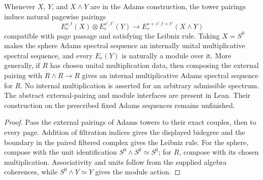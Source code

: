 \begin{theorem}
  \label{thm:adams-external-pairing}
  \notready
  Whenever $X$, $Y$, and $X\wedge Y$ are in the Adams construction, the tower
  pairings induce natural pagewise pairings
  \[
    E_r^{s,t}(X)\otimes E_r^{s',t'}(Y)
      \longrightarrow E_r^{s+s',t+t'}(X\wedge Y)
  \]
  compatible with page passage and satisfying the Leibniz rule.  Taking
  $X=S^0$ makes the sphere Adams spectral sequence an internally unital
  multiplicative spectral sequence, and every $E_r(Y)$ is naturally a module
  over it.  More generally, if $R$ has chosen unital multiplication data, then
  composing the external pairing with $R\wedge R\to R$ gives an internal
  multiplicative Adams spectral sequence for $R$.  No internal multiplication
  is asserted for an arbitrary admissible spectrum.
  The abstract external-pairing and module interfaces are present in Lean.
  Their construction on the prescribed fixed Adams sequences remains
  unfinished.
\end{theorem}

\begin{proof}
  Pass the external pairings of Adams towers to their exact couples, then to
  every page.  Addition of filtration indices gives the displayed bidegree and
  the boundary in the paired filtered complex gives the Leibniz rule.  For the
  sphere, compose with the unit identification
  $S^0\wedge S^0\simeq S^0$; for $R$, compose with its chosen multiplication.
  Associativity and units follow from the supplied algebra coherences, while
  $S^0\wedge Y\simeq Y$ gives the module action.
\end{proof}

